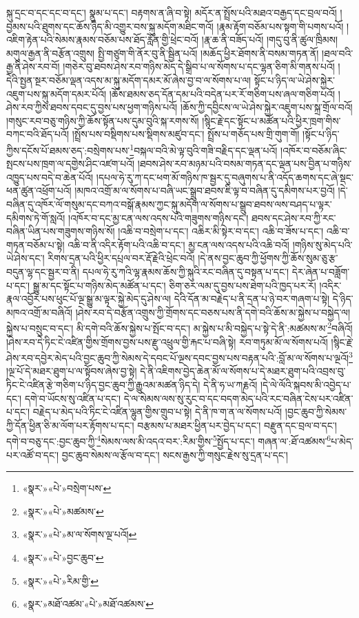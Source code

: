 སྐུ་དྲང་བ་དང་དང་བ་དང་། སྣུམ་པ་དང་། བརྟགས་ན་ཞི་བ་སྟེ། མདོར་ན་སྤྲོས་པའི་མཐའ་བརྒྱད་དང་བྲལ་བའོ། །བྱམས་པའི་ཐུགས་དང་ཆོས་ཉིད་མི་འགྱུར་བས་སྐུ་མདོག་མཐིང་གའོ། །རྣམ་རྟོག་བཅོམ་པས་སྟག་གི་པགས་པའོ། །འཇིག་རྟེན་པའི་སེམས་རྣམས་བཅོམ་པས་ཐོད་རློན་གྱི་ཕྲེང་བའོ། །རྣ་ཆ་ནི་བཟོད་པའོ། །གདུ་བུ་ནི་ཚུལ་ཁྲིམས། མགུལ་རྒྱན་ནི་བརྩོན་འགྲུས། སྤྱི་གཙུག་གི་ནོར་བུ་ནི་སྦྱིན་པའོ། །མཆོད་ཕྱིར་ཐོགས་ནི་བསམ་གཏན་ནོ། །ཐལ་བའི་རྒྱ་ནི་ཤེས་རབ་བོ། །གཅེར་བུ་ཐབས་ཤེས་རབ་གཉིས་མེད་དེ་སྒྲིབ་པ་ལ་སོགས་པ་དང་ལྷན་ཅིག་མི་གནས་པའོ། །དེའི་སྤྱན་སྔར་བཅོམ་ལྡན་འདས་མ་སྐུ་མདོག་དམར་མོ་ཞེས་བྱ་བ་ལ་སོགས་པ་ལ། སྟོང་པ་ཉིད་ལ་ཡེ་ཤེས་སྐྱེར་འཇུག་པས་སྐུ་མདོག་དམར་པོའོ། །ཆོས་ཐམས་ཅད་དོན་དམ་པའི་བདེན་པར་རོ་གཅིག་པས་ཞལ་གཅིག་པའོ། །ཤེས་རབ་ཀྱིས་ཐབས་དབང་དུ་བྱས་པས་ཕྱག་གཉིས་པའོ། །ཆོས་ཀྱི་དབྱིངས་ལ་ཡེ་ཤེས་སྐྱེར་འཇུག་པས་སྐྲ་གྲོལ་བའོ། །གསུང་རབ་བཅུ་གཉིས་ཀྱི་ཆོས་སྟོན་པས་དུམ་བུའི་སྐ་རགས་སོ། །སྙིང་རྗེ་དང་སྟོང་པ་མཚོན་པའི་ཕྱིར་ཁྲག་གིས་བཀང་བའི་ཐོད་པའོ། །སྤྲོས་པས་བསྡིགས་པས་སྡིགས་མཛུབ་དང་། སྤྲོས་པ་གཅོད་པས་གྲི་གུག་གོ། །སྟོང་པ་ཉིད་ཀྱིས་དངོས་པོ་ཐམས་ཅད་:བསྲེགས་པས་\footnote{«སྣར་»«པེ་»བསྲེག་པས་}བསྐལ་བའི་མེ་ལྟ་བུའི་གཟི་བརྗིད་དང་ལྡན་པའོ། །འཁོར་བ་བཅོམ་ཞིང་སྤངས་པས་ཁྲག་ལ་དགྱེས་ཤིང་འཛག་པའོ། །ཐབས་ཤེས་རབ་མཉམ་པའི་བསམ་གཏན་དང་ལྡན་པས་བྱིན་པ་གཉིས་འཁྱུད་པས་བདེ་བ་ཆེན་པོའོ། །དཔལ་ཧེ་རུ་ཀ་དང་ཕག་མོ་གཉིས་ཁ་སྦྱར་དུ་བཞུགས་པ་ནི་འདོད་ཆགས་དང་ཞེ་སྡང་ཕན་ཚུན་འཕྲོག་པའོ། །མཁའ་འགྲོ་མ་ལ་སོགས་པ་བཞི་ཡང་སྒྲུབ་ཐབས་ཇི་ལྟ་བ་བཞིན་དུ་དམིགས་པར་བྱའོ། །དེ་བཞིན་དུ་འཁོར་ལོ་གསུམ་དང་བཀའ་བསྒོ་རྣམས་ཀྱང་སྐུ་མདོག་ལ་སོགས་པ་སྒྲུབ་ཐབས་ལས་བཤད་པ་ལྟར་དམིགས་ཏེ་གོ་སླའོ། །འཁོར་བ་དང་མྱ་ངན་ལས་འདས་པའི་གཟུགས་གཉིས་དང་། ཐབས་དང་ཤེས་རབ་ཀྱི་རང་བཞིན་ཡིན་པས་གཟུགས་གཉིས་སོ། །འཆི་བ་བསྲེག་པ་དང་། འཆིར་མི་སྟེར་བ་དང་། འཆི་བ་ཟོས་པ་དང་། འཆི་བ་གཏན་བཅོམ་པ་སྟེ། འཆི་བ་ནི་འདིར་རྟོག་པའི་འཆི་བ་དང་། མྱ་ངན་ལས་འདས་པའི་འཆི་བའོ། །གཉིས་སུ་མེད་པའི་ཡེ་ཤེས་དང་། རིགས་དྲན་པའི་ཕྱིར་དཔྲལ་བར་རྡོ་རྗེའི་ཕྲེང་བའོ། །དེ་ནས་བྱང་ཆུབ་ཀྱི་ཕྱོགས་ཀྱི་ཆོས་སུམ་ཅུ་རྩ་བདུན་ལྷ་དང་སྦྱར་བ་ནི། དཔལ་ཧེ་རུ་ཀའི་ལྷ་རྣམས་ཆོས་ཀྱི་སྐུའི་རང་བཞིན་དུ་བསྟན་པ་དང་། དེར་ཞེན་པ་བཟློག་པ་དང་། སྒྱུ་མ་དང་སྟོང་པ་གཉིས་མེད་མཚོན་པ་དང་། ཅིག་ཅར་ལམ་དུ་བྱས་པས་ཐེག་པའི་ཁྱད་པར་རོ། །འདིར་རྣལ་འབྱོར་པས་ཕུང་པོ་ལྔ་སྒྱུ་མ་ལྟར་སྐྱེ་མེད་དུ་ཤེས་ལ། དེའི་དོན་མ་བརྗེད་པ་ནི་དྲན་པ་ཉེ་བར་གཞག་པ་སྟེ། དེ་ཉིད་མཁའ་འགྲོ་མ་བཞིའོ། །ཤེས་རབ་དེ་བརྩོན་འགྲུས་ཀྱི་གྲོགས་དང་བཅས་པས་ནི་དགེ་བའི་ཆོས་མ་སྐྱེས་པ་བསྐྱེད་ལ། སྐྱེས་པ་བསྲུང་བ་དང་། མི་དགེ་བའི་ཆོས་སྐྱེས་པ་སྤོང་བ་དང་། མ་སྐྱེས་པ་མི་བསྐྱེད་པ་སྟེ་དེ་ནི་:མཚམས་མ་\footnote{«སྣར་»«པེ་»མཚམས་}བཞིའོ། །ཤེས་རབ་དེ་ཏིང་ངེ་འཛིན་གྱིས་གྲོགས་བྱས་པས་རྫུ་འཕྲུལ་གྱི་རྐང་པ་བཞི་སྟེ། རབ་གཏུམ་མོ་ལ་སོགས་པའོ། །སྙིང་རྗེ་ཤེས་རབ་དབྱེར་མེད་པའི་བྱང་ཆུབ་ཀྱི་སེམས་དེ་དབང་པོ་ལྔས་དབང་བྱས་པས་བརྟན་པའི་:བློ་མ་ལ་སོགས་པ་ལྔའོ།\footnote{«སྣར་»«པེ་»མ་ལ་སོགས་ལྔ་པའོ།} །ལྔ་པོ་དེ་མཐར་ཐུག་པ་ལ་སྟོབས་ཞེས་བྱ་སྟེ། དེ་ནི་འཇིགས་བྱེད་ཆེན་མོ་ལ་སོགས་པ་དེ་མཐར་ཐུག་པའི་འབྲས་བུ་ཏིང་ངེ་འཛིན་རྩེ་གཅིག་པ་ཉིད་བྱང་ཆུབ་ཀྱི་རྒྱུའམ་མཚན་ཉིད་དེ། དེ་ནི་ཧ་ཡ་ཀརྞའོ། །དེ་ལེ་ལོའི་སྐབས་མི་འབྱེད་པ་དང་། དགེ་བ་ཡོངས་སུ་འཛིན་པ་དང་། དེ་ལ་སེམས་ལས་སུ་རུང་བ་དང་བདག་མེད་པའི་རང་བཞིན་ངེས་པར་འཛིན་པ་དང་། བརྗེད་པ་མེད་པའི་ཏིང་ངེ་འཛིན་ལྷུན་གྱིས་གྲུབ་པ་སྟེ། དེ་ནི་ཁ་ག་ན་ལ་སོགས་པའོ། །བྱང་ཆུབ་ཀྱི་སེམས་ཀྱི་དོན་ཕྱིན་ཅི་མ་ལོག་པར་རྟོགས་པ་དང་། བརྩམས་པ་མཐར་ཕྱིན་པར་བྱེད་པ་དང་། བརྫུན་དང་བྲལ་བ་དང་། དགེ་བ་བཅུ་དང་:བྱང་ཆུབ་ཀྱི་\footnote{«སྣར་»«པེ་»བྱང་ཆུབ་}སེམས་ལས་མི་འདའ་བར་:རིམ་གྱིས་\footnote{«སྣར་»«པེ་»རིམ་གྱི་}སྤྱོད་པ་དང་། གཞན་ལ་:ཐོ་འཚམས་\footnote{«སྣར་»མཐོ་འཚམ་«པེ་»མཐོ་འཚམས་}པ་མེད་པར་འཚོ་བ་དང་། བྱང་ཆུབ་སེམས་ལ་རྩོལ་བ་དང་། སངས་རྒྱས་ཀྱི་གསུང་རྗེས་སུ་དྲན་པ་དང་། 